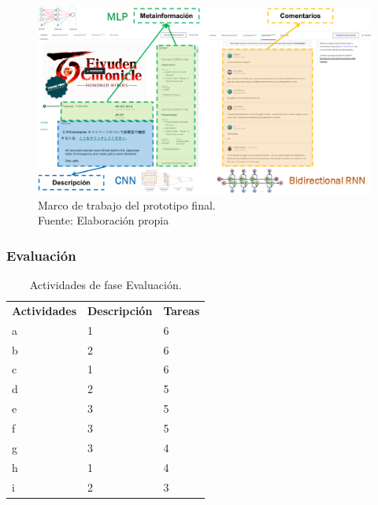 \begin{figure}[htbp]
	\begin{center}
		\includegraphics[width=1\textwidth]{3/figures/framework.png}
		\caption[Marco de trabajo del prototipo final]{Marco de trabajo del prototipo final.\\
			Fuente: Elaboración propia}
		\label{3:fig7}
	\end{center}
\end{figure}

\subsubsection{Evaluación}

\begin{longtable}{|M{5cm}|M{5cm}|M{5cm}|}
	\caption[Actividades de fase Evaluación]{Actividades de fase Evaluación.}
	\label{3:table7}
	\newcommand{\multirot}[1]{\multirow{2}{*}[-8ex]{\rotcell{\rlap{#1}}}}
	\footnotesize
	\centering
	\small
	\tabularnewline\hline
	\textbf{Actividades} & \textbf{Descripción} & \textbf{Tareas}
	\\
	\hline
	a
	& 1
	& 6                                               
	\\
	\hline
	b
	& 2
	& 6
	\\
	\hline
	c
	& 1
	& 6
	\\
	\hline
	d
	& 2
	& 5
	\\
	\hline
	e
	& 3
	& 5
	\\
	\hline
	f
	& 3
	& 5
	\\
	\hline
	g
	& 3
	& 4
	\\
	\hline
	h
	& 1
	& 4
	\\
	\hline
	i
	& 2
	& 3
	\\
	\hline
\end{longtable}%

